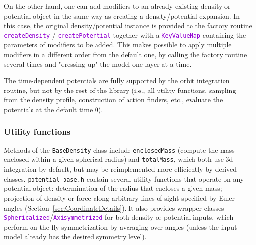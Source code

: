 \documentclass[12pt]{article}
\newcommand{\ttt}[1]{\textcolor{darkviolet}{\texttt{#1}}}
\begin{document}
\begin{itemize}
%
On the other hand, one can add modifiers to an already existing density or potential object in the same way as creating a density/potential expansion. In this case, the original density/potential instance is provided to the factory routine \ttt{createDensity} / \ttt{createPotential} together with a \ttt{KeyValueMap} containing the parameters of modifiers to be added. This makes possible to apply multiple modifiers in a different order from the default one, by calling the factory routine several times and "dressing up" the model one layer at a time.
\end{itemize}

The time-dependent potentials are fully supported by the orbit integration routine, but not by the rest of the library (i.e., all utility functions, sampling from the density profile, construction of action finders, etc., evaluate the potentials at the default time 0).

\subsubsection{Utility functions}  \label{sec:PotentialUtility}

Methods of the \texttt{BaseDensity} class include \texttt{enclosedMass} (compute the mass enclosed within a given spherical radius) and \texttt{totalMass}, which both use 3d integration by default, but may be reimplemented more efficiently by derived classes. \texttt{potential_base.h} contain several utility functions that operate on any potential object: determination of the radius that encloses a given mass; projection of density or force along arbitrary lines of sight specified by Euler angles (Section~\ref{sec:CoordinateDetails}). It also provides wrapper classes \ttt{Sphericalized}/\ttt{Axisymmetrized} for both density or potential inputs, which perform on-the-fly symmetrization by averaging over angles (unless the input model already has the desired symmetry level). 
\end{document}
